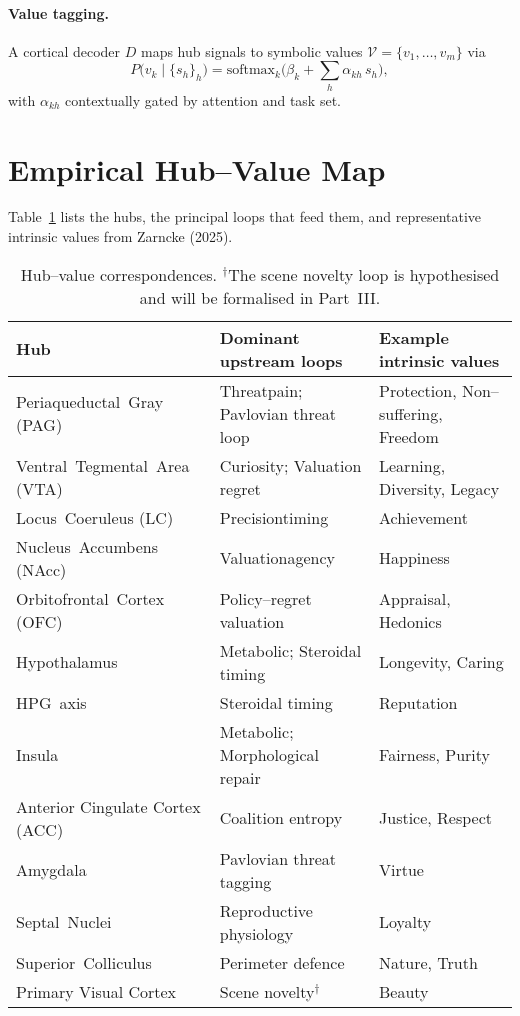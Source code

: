 \documentclass[11pt]{article}
\begin{document}
\paragraph{Value tagging.} A cortical decoder $D$ maps hub signals to symbolic values $\mathcal{V}=\{v_1,\dots,v_m\}$ via
\begin{equation}
 P\bigl(v_k\mid\{s_h\}_h\bigr)=\mathrm{softmax}_k\bigl(\beta_k+\sum_h \alpha_{kh}\,s_h\bigr),
\end{equation}
with $\alpha_{kh}$ contextually gated by attention and task set.

\section{Empirical Hub--Value Map}
Table~\ref{tab:hv} lists the hubs, the principal loops that feed them, and representative intrinsic values from Zarncke (2025).

\begin{table}[h]
\centering
\footnotesize
\begin{tabular}{@{}lll@{}}
\toprule
Hub & Dominant upstream loops & Example intrinsic values \\
\midrule
Periaqueductal~Gray (PAG) & Threat\/pain; Pavlovian threat loop & Protection, Non--suffering, Freedom \\
Ventral~Tegmental~Area (VTA) & Curiosity; Valuation regret & Learning, Diversity, Legacy \\
Locus~Coeruleus (LC) & Precision\/timing & Achievement \\
Nucleus~Accumbens (NAcc) & Valuation\/agency & Happiness \\
Orbitofrontal~Cortex (OFC) & Policy--regret valuation & Appraisal, Hedonics \\
Hypothalamus & Metabolic; Steroidal timing & Longevity, Caring \\
HPG~axis & Steroidal timing & Reputation \\
Insula & Metabolic; Morphological repair & Fairness, Purity \\
Anterior Cingulate Cortex (ACC) & Coalition entropy & Justice, Respect \\
Amygdala & Pavlovian threat tagging & Virtue \\
Septal~Nuclei & Reproductive physiology & Loyalty \\
Superior~Colliculus & Perimeter defence & Nature, Truth \\
Primary Visual Cortex & Scene novelty$^{\dagger}$ & Beauty \\
\bottomrule
\end{tabular}
\caption{Hub--value correspondences. $^{\dagger}$The scene novelty loop is hypothesised and will be formalised in Part~III.}
\label{tab:hv}
\end{table}
\end{document}
